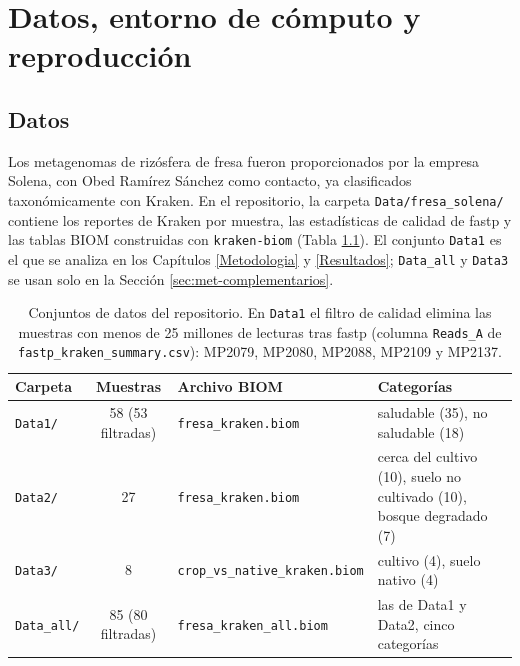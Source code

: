 \chapter[Datos, entorno y reproducción]{Datos, entorno de cómputo y reproducción}
\label{ap:datos}

\section*{Datos}

Los metagenomas de rizósfera de fresa fueron proporcionados por la empresa Solena, con Obed
Ramírez Sánchez como contacto, ya clasificados taxonómicamente con Kraken. En el repositorio,
la carpeta \texttt{Data/fresa\_solena/} contiene los reportes de Kraken por muestra, las estadísticas
de calidad de fastp y las tablas BIOM construidas con \texttt{kraken-biom}
(Tabla \ref{tab:datos-conjuntos}). El conjunto \texttt{Data1} es el que se analiza en los
Capítulos \ref{Metodologia} y \ref{Resultados}; \texttt{Data\_all} y \texttt{Data3} se usan solo en
la Sección \ref{sec:met-complementarios}.

\begin{table}[H]
\centering
\caption{Conjuntos de datos del repositorio. En \texttt{Data1} el filtro de calidad elimina las
muestras con menos de 25 millones de lecturas tras fastp (columna \texttt{Reads\_A} de
\texttt{fastp\_kraken\_summary.csv}): MP2079, MP2080, MP2088, MP2109 y MP2137.}
\label{tab:datos-conjuntos}
\footnotesize
\setlength{\tabcolsep}{3pt}
\begin{tabular}{lcp{3.1cm}p{4.0cm}}
\hline
Carpeta & Muestras & Archivo BIOM & Categorías \\
\hline
\texttt{Data1/} & 58 (53 filtradas) & \texttt{fresa\_kraken.biom} & saludable (35), no saludable (18) \\
\texttt{Data2/} & 27 & \texttt{fresa\_kraken.biom} & cerca del cultivo (10), suelo no cultivado (10), bosque degradado (7) \\
\texttt{Data3/} & 8 & \texttt{crop\_vs\_native\_}\newline\texttt{kraken.biom} & cultivo (4), suelo nativo (4) \\
\texttt{Data\_all/} & 85 (80 filtradas) & \texttt{fresa\_kraken\_}\newline\texttt{all.biom} & las de Data1 y Data2, cinco categorías \\
\hline
\end{tabular}
\end{table}

